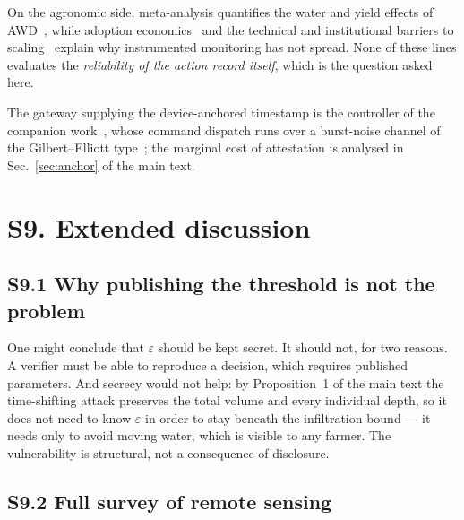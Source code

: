 On the agronomic side, meta-analysis quantifies the water and yield effects of
AWD~\cite{carrijo2017}, while adoption economics~\cite{lampayan2015} and the
technical and institutional barriers to scaling~\cite{enriquez2021} explain why
instrumented monitoring has not spread. None of these lines evaluates the
\emph{reliability of the action record itself}, which is the question asked here.

The gateway supplying the device-anchored timestamp is the controller of the
companion work~\cite{twingate2026}, whose command dispatch runs over a
burst-noise channel of the Gilbert--Elliott type~\cite{gilbert1960,elliott1963};
the marginal cost of attestation is analysed in Sec.~\ref{sec:anchor} of the main text.

\section*{S9. Extended discussion}

\subsection*{S9.1 Why publishing the threshold is not the problem}

One might conclude that $\varepsilon$ should be kept secret. It should not, for
two reasons. A verifier must be able to reproduce a decision, which requires
published parameters. And secrecy would not help: by Proposition~1 of the main
text the time-shifting attack preserves the total volume and every individual
depth, so it does not need to know $\varepsilon$ in order to stay beneath the
infiltration bound --- it needs only to avoid moving water, which is visible to
any farmer. The vulnerability is structural, not a consequence of disclosure.

\subsection*{S9.2 Full survey of remote sensing}

